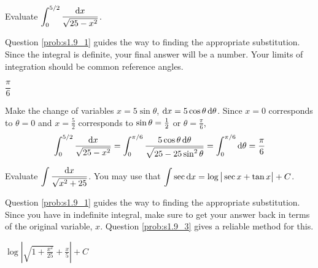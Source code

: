 \begin{Mquestion}[M105 2013A]
Evaluate $\displaystyle\int_0^{5/2} \frac{\mathrm{d}x}{\sqrt{25-x^2}}$.
\end{Mquestion}

\begin{hint} 
Question \ref{prob:s1.9_1} guides the way to finding the appropriate substitution.
Since the integral is definite, your final answer will be a number. Your limits of integration should be common reference angles.
\end{hint}

\begin{answer} 
$\dfrac{\pi}{6}$ 
\end{answer}

\begin{solution} 
 Make the change of variables $x=5\sin\theta$, $\mathrm{d}x=5\cos\theta\,\mathrm{d}\theta$. 
Since $x=0$ corresponds to $\theta=0$ and $x=\frac{5}{2}$ corresponds to
$\sin\theta=\tfrac{1}{2}$ or $\theta =\frac{\pi}{6}$,
\begin{align*}
\int_0^{5/2} \frac{\mathrm{d}x}{\sqrt{25-x^2}}
=\int_0^{\pi/6} \frac{5\cos\theta\,\mathrm{d}\theta}{\sqrt{25-25\sin^2\theta}}
=\int_0^{\pi/6} \mathrm{d}\theta
=\frac{\pi}{6}
\end{align*}
\end{solution}

\begin{Mquestion}[M105 2015A]
Evaluate $\displaystyle\int \frac{\mathrm{d}x}{\sqrt{x^2+25}}$.
You may use that 
${\displaystyle\int} \sec \mathrm{d}x = \log\big|\sec x+\tan x\big|+C$.
\end{Mquestion}

\begin{hint} 
Question \ref{prob:s1.9_1} guides the way to finding the appropriate substitution. Since you have in indefinite integral, make sure to get your answer back in terms of the original variable, $x$. Question \ref{prob:s1.9_3} gives a reliable method for this.
\end{hint}

\begin{answer} 
$\displaystyle\log\left|\sqrt{1+\frac{x^2}{25}}+\frac{x}{5}\right|+C$
\end{answer}

